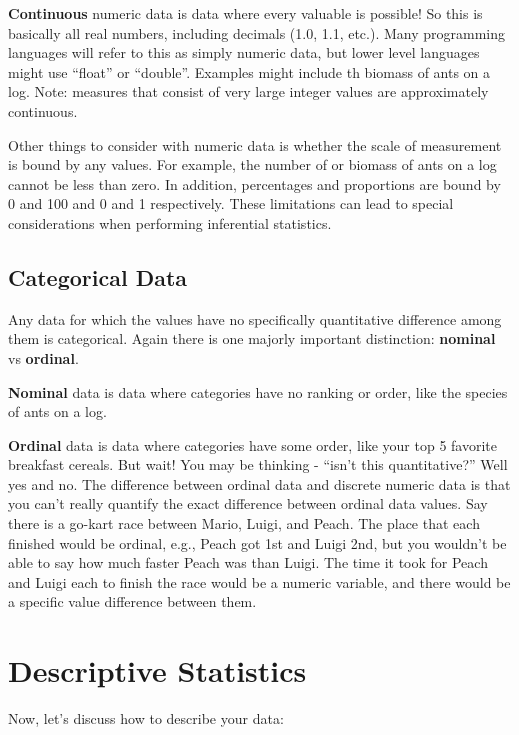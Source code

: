 \documentclass[
  letterpaper,
  DIV=11,
  numbers=noendperiod]{scrreprt}
\begin{document}
\textbf{Continuous} numeric data is data where every valuable is
possible! So this is basically all real numbers, including decimals
(1.0, 1.1, etc.). Many programming languages will refer to this as
simply numeric data, but lower level languages might use ``float'' or
``double''. Examples might include th biomass of ants on a log. Note:
measures that consist of very large integer values are approximately
continuous.

Other things to consider with numeric data is whether the scale of
measurement is bound by any values. For example, the number of or
biomass of ants on a log cannot be less than zero. In addition,
percentages and proportions are bound by 0 and 100 and 0 and 1
respectively. These limitations can lead to special considerations when
performing inferential statistics.

\hypertarget{categorical-data}{%
\section{Categorical Data}\label{categorical-data}}

Any data for which the values have no specifically quantitative
difference among them is categorical. Again there is one majorly
important distinction: \textbf{nominal} vs \textbf{ordinal}.

\textbf{Nominal} data is data where categories have no ranking or order,
like the species of ants on a log.

\textbf{Ordinal} data is data where categories have some order, like
your top 5 favorite breakfast cereals. But wait! You may be thinking -
``isn't this quantitative?'' Well yes and no. The difference between
ordinal data and discrete numeric data is that you can't really quantify
the exact difference between ordinal data values. Say there is a go-kart
race between Mario, Luigi, and Peach. The place that each finished would
be ordinal, e.g., Peach got 1st and Luigi 2nd, but you wouldn't be able
to say how much faster Peach was than Luigi. The time it took for Peach
and Luigi each to finish the race would be a numeric variable, and there
would be a specific value difference between them.

\hypertarget{descriptive-statistics}{%
\chapter{Descriptive Statistics}\label{descriptive-statistics}}

Now, let's discuss how to describe your data:
\end{document}
